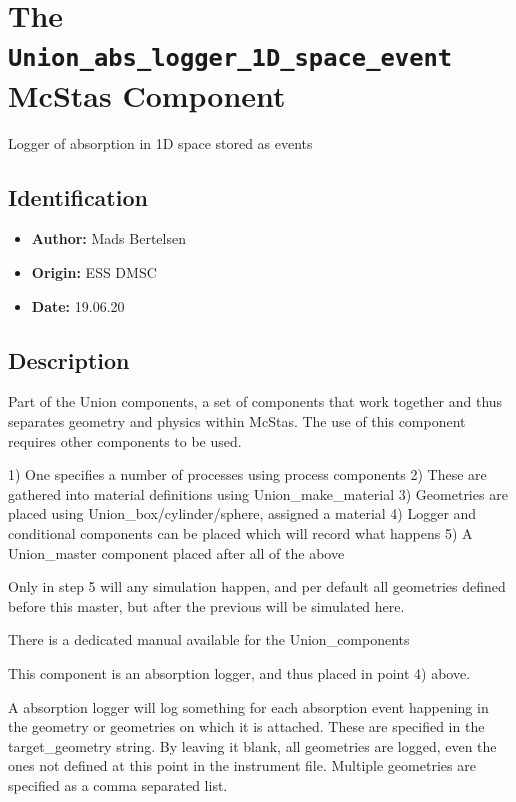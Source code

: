 \section{The \texttt{Union\_abs\_logger\_1D\_space\_event} McStas Component}
Logger of absorption in 1D space stored as events

\subsection*{Identification}
\begin{itemize}
  \item \textbf{Author:} Mads Bertelsen
  \item \textbf{Origin:} ESS DMSC
  \item \textbf{Date:} 19.06.20
\end{itemize}

\subsection*{Description}
Part of the Union components, a set of components that work together and thus separates geometry and physics within McStas. The use of this component requires other components to be used.

1) One specifies a number of processes using process components 2) These are gathered into material definitions using Union\_make\_material 3) Geometries are placed using Union\_box/cylinder/sphere, assigned a material 4) Logger and conditional components can be placed which will record what happens 5) A Union\_master component placed after all of the above

Only in step 5 will any simulation happen, and per default all geometries defined before this master, but after the previous will be simulated here.

There is a dedicated manual available for the Union\_components

This component is an absorption logger, and thus placed in point 4) above.

A absorption logger will log something for each absorption event happening in the geometry or geometries on which it is attached. These are specified in the target\_geometry string. By leaving it blank, all geometries are logged, even the ones not defined at this point in the instrument file. Multiple geometries are specified as a comma separated list.

